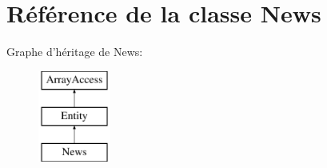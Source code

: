 \hypertarget{class_library_1_1_entities_1_1_news}{\section{Référence de la classe News}
\label{class_library_1_1_entities_1_1_news}
}
Graphe d'héritage de News\+:\begin{figure}[H]
\begin{center}
\leavevmode
\includegraphics[height=3.000000cm]{class_library_1_1_entities_1_1_news}
\end{center}
\end{figure}
